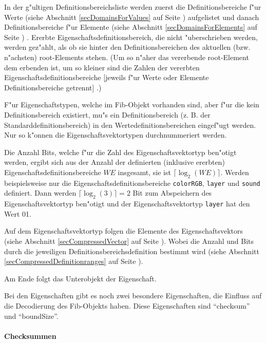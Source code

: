 In der g"ultigen Definitionsbereichsliste werden zuerst die Definitionsbereiche f"ur Werte (siehe Abschnitt \ref{secDomainsForValues} auf Seite \pageref{secDomainsForValues}) aufgelistet und danach Definitionsbereiche f"ur Elemente (siehe Abschnitt \ref{secDomainsForElements} auf Seite \pageref{secDomainsForElements}) .
Ererbte Eigenschaftsdefinitionsbereich, die nicht "uberschrieben werden, werden gez"ahlt, als ob sie hinter den Definitionsbereichen des aktuellen (bzw. n"achsten) root-Elements stehen. (Um so n"aher das vererbende root-Element dem erbenden ist, um so kleiner sind die Zahlen der vererbten Eigenschaftsdefinitionsbereiche [jeweils f"ur Werte oder Elemente Definitionsbereiche getrennt] .)

F"ur Eigenschaftstypen, welche im Fib-Objekt vorhanden sind, aber f"ur die kein Definitionsbereich existiert, mu"s ein Definitionsbereich (z. B. der Standarddefinitionsbereich) in den Wertedefinitionsbereichen eingef"ugt werden. Nur so k"onnen die Eigenschaftsvektortypen durchnummeriert werden.

Die Anzahl Bits, welche f"ur die Zahl des Eigenschaftsvektortyp ben"otigt werden, ergibt sich aus der Anzahl der definierten (inklusive ererbten) Eigenschaftsdefinitionsbereiche $WE$ insgesamt, sie ist $\lceil \log_2(WE) \rceil $.
Werden beispielsweise nur die Eigenschaftsdefinitionsbereiche \verb|colorRGB|, \verb|layer| und \verb|sound| definiert. Dann werden $\lceil \log_2(3) \rceil = 2$ Bit zum Abspeichern des Eigenschaftsvektortyp ben"otigt und der Eigenschaftsvektortyp \verb|layer| hat den Wert 01.

Auf dem Eigenschaftsvektortyp folgen die Elemente des Eigenschaftsvektors (siehe Abschnitt \ref{secCompressedVector} auf Seite \pageref{secCompressedVector}). Wobei die Anzahl und Bits durch die jeweiligen Definitionsbereichsdefinition bestimmt wird (siehe Abschnitt \ref{secCompressedDefinitionranges} auf Seite \pageref{secCompressedDefinitionranges}).

Am Ende folgt das Unterobjekt der Eigenschaft.

\bigskip\noindent
Bei den Eigenschaften gibt es noch zwei besondere Eigenschaften, die Einfluss auf die Decodierung des Fib-Objekts haben. Diese Eigenschaften sind ``checksum'' und ``boundSize''.


\paragraph{Checksummen}
\label{secCompressedChecksumm}

